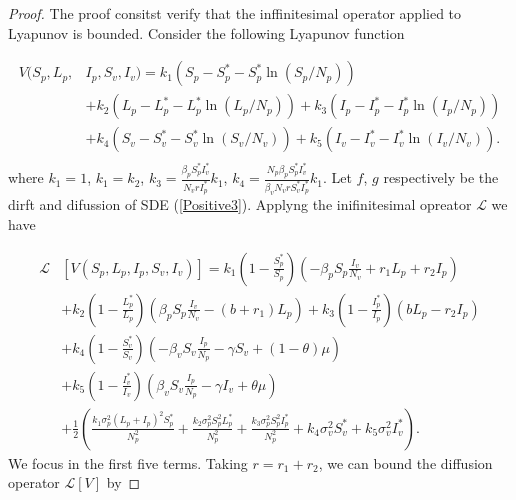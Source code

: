 \begin{proof}
	The proof consitst verify that the inffinitesimal operator applied to Lyapunov is bounded. Consider the following Lyapunov function
	
	\begin{equation}
		\begin{aligned}
				V(S_p,L_p,&I_p,S_v,I_v) 
					= 
						k_1(S_p-S_p^*-S_p^*\ln(S_p/N_p))\\
					&+
						k_2(L_p-L_p^*-L_p^*\ln(L_p/N_p))+k_3(I_p-I_p^*-I_p^*\ln(I_p/N_p))\\
					&+
					k_4(S_v-S_v^*-S_v^*\ln(S_v/N_v))+k_5(I_v-I_v^*-I_v^*\ln(I_v/N_v)).\\						
		\end{aligned}
	\end{equation}
%
    where $k_1=1$, $k_1=k_2$, $k_3=\frac{\beta_p S_p^* I_v^*}{N_vrI_p^*}k_1$, $k_4 = \frac{N_p\beta_p S_p^* I_v^*}{\beta_v N_vrS_v^*I_p^*}k_1$. Let $f$, $g$ respectively be the dirft and difussion of SDE (\ref{Positive3}).	Applyng the inifinitesimal opreator $\mathcal{L}$ we have
	
	\begin{align*}
		\mathcal{L}&[V(S_p,L_p,I_p,S_v,I_v)]= 
				k_1\left(1-\frac{S_p^*}{S_p}\right)\left(-\beta_p S_p\frac{I_v}{N_v}+r_1L_p+r_2I_p\right)\\
			&+
				k_2\left(1-\frac{L_p^*}{L_p}\right)\left(\beta_p S_p\frac{I_v}{N_v}-(b+r_1)L_p\right)
			+
				k_3\left(1-\frac{I_p^*}{I_p}\right)\left(bL_p-r_2I_p\right)\\
			&+
				k_4\left(1-\frac{S_v^*}{S_v}\right)\left(-\beta_v S_v\frac{I_p}{N_p}-\gamma S_v +(1-\theta)\mu\right)\\
			&+
				k_5\left(1-\frac{I_v^*}{I_v}\right)\left(\beta_v S_v\frac{I_p}{N_p}-\gamma I_v+\theta\mu\right)\\
			&+
				\frac{1}{2}\left(\frac{k_1\sigma_p^2(L_p+I_p)^2S_p^*}{N^2_p}+\frac{k_2\sigma_p^2S_p^2 L_p^*}{N^2_p}+\frac{k_3\sigma_p^2S_p^2 I_p^*}{N^2_p}
			+
				k_4\sigma_v^2S_v^*+k_5\sigma_v^2I_v^*\right).
	\end{align*}
	We focus in the first five terms. Taking $r=r_1+r_2$, we can bound the diffusion operator $\mathcal{L}[V]$ by 
	

\end{proof}
